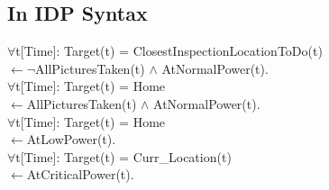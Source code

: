 \documentclass{article}
\begin{document}
\subsection{In IDP Syntax}
$\forall$t[Time]: Target(t) = ClosestInspectionLocationToDo(t) \\ \indent$\leftarrow$$\neg$AllPicturesTaken(t) $\wedge$ AtNormalPower(t). \vspace{2mm}\\
$\forall$t[Time]: Target(t) = Home \\ \indent$\leftarrow$AllPicturesTaken(t) $\wedge$ AtNormalPower(t). \vspace{2mm}\\
$\forall$t[Time]: Target(t) = Home \\ \indent$\leftarrow$AtLowPower(t). \vspace{2mm}\\
$\forall$t[Time]: Target(t) = Curr\_Location(t) \\ \indent$\leftarrow$AtCriticalPower(t). 
\end{document}

